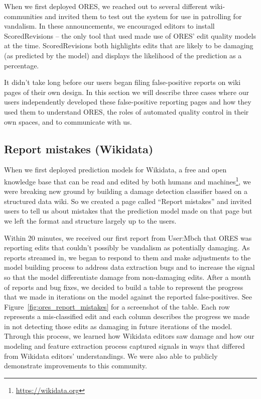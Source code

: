When we first deployed ORES, we reached out to several different wiki-communities and invited them to test out the system for use in patrolling for vandalism.  In these announcements, we encouraged editors to install ScoredRevisions -- the only tool that used made use of ORES' edit quality models at the time.  ScoredRevisions both highlights edits that are likely to be damaging (as predicted by the model) and displays the likelihood of the prediction as a percentage.

It didn't take long before our users began filing false-positive reports on wiki pages of their own design.  In this section we will describe three cases where our users independently developed these false-positive reporting pages and how they used them to understand ORES, the roles of automated quality control in their own spaces, and to communicate with us.

\subsection{Report mistakes (Wikidata)}

When we first deployed prediction models for Wikidata, a free and open knowledge base that can be read and edited by both humans and machines\footnote{\url{https://wikidata.org}}, we were breaking new ground by building a damage detection classifier based on a structured data wiki\cite{sarabadani2017building}.  So we created a page called ``Report mistakes'' and invited users to tell us about mistakes that the prediction model made on that page but we left the format and structure largely up to the users.

Within 20 minutes, we received our first report from User:Mbch that ORES was reporting edits that couldn't possibly be vandalism as potentially damaging.  As reports streamed in, we began to respond to them and make adjustments to the model building process to address data extraction bugs and to increase the signal so that the model differentiate damage from non-damaging edits.  After a month of reports and bug fixes, we decided to build a table to represent the progress that we made in iterations on the model against the reported false-positives.  See Figure~\ref{fig:ores_report_mistakes} for a screenshot of the table.  Each row represents a mis-classified edit and each column describes the progress we made in not detecting those edits as damaging in future iterations of the model.  Through this process, we learned how Wikidata editors saw damage and how our modeling and feature extraction process captured signals in ways that differed from Wikidata editors' understandings.  We were also able to publicly demonstrate improvements to this community.

